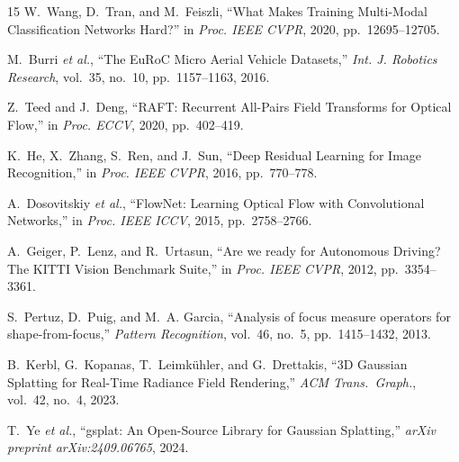 \documentclass[conference]{IEEEtran}
\begin{document}
\begin{thebibliography}{15}
W.~Wang, D.~Tran, and M.~Feiszli, ``What Makes Training Multi-Modal Classification Networks Hard?'' in \textit{Proc. IEEE CVPR}, 2020, pp.~12695--12705.

M.~Burri \textit{et al.}, ``The EuRoC Micro Aerial Vehicle Datasets,'' \textit{Int. J. Robotics Research}, vol.~35, no.~10, pp.~1157--1163, 2016.

Z.~Teed and J.~Deng, ``RAFT: Recurrent All-Pairs Field Transforms for Optical Flow,'' in \textit{Proc. ECCV}, 2020, pp.~402--419.

K.~He, X.~Zhang, S.~Ren, and J.~Sun, ``Deep Residual Learning for Image Recognition,'' in \textit{Proc. IEEE CVPR}, 2016, pp.~770--778.

A.~Dosovitskiy \textit{et al.}, ``FlowNet: Learning Optical Flow with Convolutional Networks,'' in \textit{Proc. IEEE ICCV}, 2015, pp.~2758--2766.

A.~Geiger, P.~Lenz, and R.~Urtasun, ``Are we ready for Autonomous Driving? The KITTI Vision Benchmark Suite,'' in \textit{Proc. IEEE CVPR}, 2012, pp.~3354--3361.

S.~Pertuz, D.~Puig, and M.~A. Garcia, ``Analysis of focus measure operators for shape-from-focus,'' \textit{Pattern Recognition}, vol.~46, no.~5, pp.~1415--1432, 2013.

B.~Kerbl, G.~Kopanas, T.~Leimk\"{u}hler, and G.~Drettakis,
``3D Gaussian Splatting for Real-Time Radiance Field Rendering,''
\textit{ACM Trans.\ Graph.}, vol.~42, no.~4, 2023.

T.~Ye \textit{et al.},
``gsplat: An Open-Source Library for Gaussian Splatting,''
\textit{arXiv preprint arXiv:2409.06765}, 2024.


\end{thebibliography}
\end{document}
